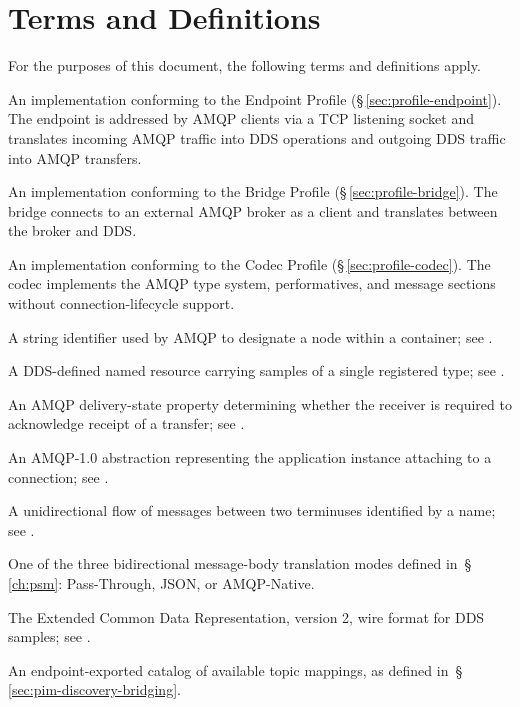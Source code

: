\documentclass{../styles/zerodds-vendor-spec}
\begin{document}
\chapter{Terms and Definitions}

For the purposes of this document, the following terms and
definitions apply.

\begin{description}[leftmargin=2cm,style=nextline]
  \item[Endpoint] An implementation conforming to the Endpoint
        Profile (\S\,\ref{sec:profile-endpoint}). The endpoint is
        addressed by AMQP clients via a TCP listening socket and
        translates incoming AMQP traffic into DDS operations and
        outgoing DDS traffic into AMQP transfers.
  \item[Bridge] An implementation conforming to the Bridge Profile
        (\S\,\ref{sec:profile-bridge}). The bridge connects to an
        external AMQP broker as a client and translates between the
        broker and DDS.
  \item[Codec] An implementation conforming to the Codec Profile
        (\S\,\ref{sec:profile-codec}). The codec implements the
        AMQP type system, performatives, and message sections
        without connection-lifecycle support.
  \item[Address] A string identifier used by AMQP to designate a
        node within a container; see
        .
  \item[Topic] A DDS-defined named resource carrying samples of a
        single registered type; see .
  \item[Settlement Mode] An AMQP delivery-state property
        determining whether the receiver is required to acknowledge
        receipt of a transfer; see
        .
  \item[Container] An AMQP-1.0 abstraction representing the
        application instance attaching to a connection; see
        .
  \item[Link] A unidirectional flow of messages between two
        terminuses identified by a name; see
        .
  \item[Body Encoding Mode] One of the three bidirectional
        message-body translation modes defined
        in~\S\,\ref{ch:psm}: Pass-Through, JSON, or AMQP-Native.
  \item[XCDR2] The Extended Common Data Representation, version 2,
        wire format for DDS samples; see
        .
  \item[Address Catalog] An endpoint-exported catalog of available
        topic mappings, as defined
        in~\S\,\ref{sec:pim-discovery-bridging}.
\end{description}
\end{document}
